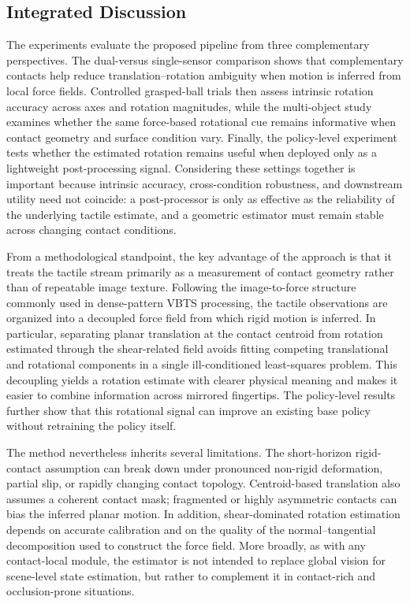 \documentclass[letterpaper,10pt,journal,twoside]{IEEEtran}
\begin{document}
\subsection{Integrated Discussion}
\label{subsec:integrated_discussion}

The experiments evaluate the proposed pipeline from three complementary perspectives. The dual-versus single-sensor comparison shows that complementary contacts help reduce translation--rotation ambiguity when motion is inferred from local force fields. Controlled grasped-ball trials then assess intrinsic rotation accuracy across axes and rotation magnitudes, while the multi-object study examines whether the same force-based rotational cue remains informative when contact geometry and surface condition vary. Finally, the policy-level experiment tests whether the estimated rotation remains useful when deployed only as a lightweight post-processing signal. Considering these settings together is important because intrinsic accuracy, cross-condition robustness, and downstream utility need not coincide: a post-processor is only as effective as the reliability of the underlying tactile estimate, and a geometric estimator must remain stable across changing contact conditions.

From a methodological standpoint, the key advantage of the approach is that it treats the tactile stream primarily as a measurement of contact geometry rather than of repeatable image texture. Following the image-to-force structure commonly used in dense-pattern VBTS processing, the tactile observations are organized into a decoupled force field from which rigid motion is inferred. In particular, separating planar translation at the contact centroid from rotation estimated through the shear-related field avoids fitting competing translational and rotational components in a single ill-conditioned least-squares problem. This decoupling yields a rotation estimate with clearer physical meaning and makes it easier to combine information across mirrored fingertips. The policy-level results further show that this rotational signal can improve an existing base policy without retraining the policy itself.

The method nevertheless inherits several limitations. The short-horizon rigid-contact assumption can break down under pronounced non-rigid deformation, partial slip, or rapidly changing contact topology. Centroid-based translation also assumes a coherent contact mask; fragmented or highly asymmetric contacts can bias the inferred planar motion. In addition, shear-dominated rotation estimation depends on accurate calibration and on the quality of the normal--tangential decomposition used to construct the force field. More broadly, as with any contact-local module, the estimator is not intended to replace global vision for scene-level state estimation, but rather to complement it in contact-rich and occlusion-prone situations.
\end{document}
